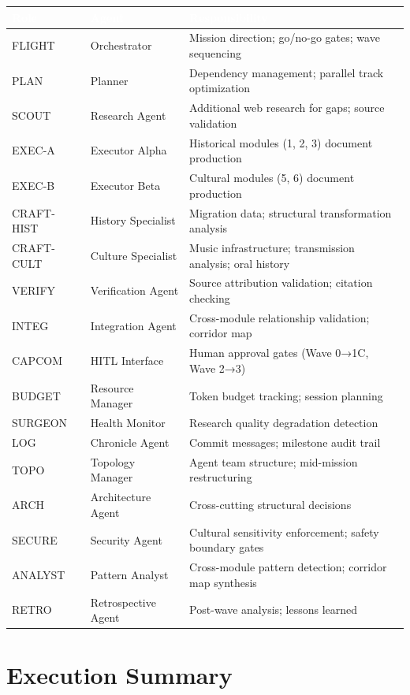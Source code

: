 \documentclass[11pt,letterpaper]{article}
\newcommand{\tableheader}[1]{\textbf{\sffamily\textcolor{white}{#1}}}
\begin{document}
\begin{center}
\begin{tabularx}{\textwidth}{L{2cm}L{3cm}X}
\toprule
{}
\tableheader{Role} & \tableheader{Agent} & \tableheader{Responsibility} \\
\midrule
FLIGHT & Orchestrator & Mission direction; go/no-go gates; wave sequencing \\
PLAN & Planner & Dependency management; parallel track optimization \\
SCOUT & Research Agent & Additional web research for gaps; source validation \\
EXEC-A & Executor Alpha & Historical modules (1, 2, 3) document production \\
EXEC-B & Executor Beta & Cultural modules (5, 6) document production \\
CRAFT-HIST & History Specialist & Migration data; structural transformation analysis \\
CRAFT-CULT & Culture Specialist & Music infrastructure; transmission analysis; oral history \\
VERIFY & Verification Agent & Source attribution validation; citation checking \\
INTEG & Integration Agent & Cross-module relationship validation; corridor map \\
CAPCOM & HITL Interface & Human approval gates (Wave 0→1C, Wave 2→3) \\
BUDGET & Resource Manager & Token budget tracking; session planning \\
SURGEON & Health Monitor & Research quality degradation detection \\
LOG & Chronicle Agent & Commit messages; milestone audit trail \\
TOPO & Topology Manager & Agent team structure; mid-mission restructuring \\
ARCH & Architecture Agent & Cross-cutting structural decisions \\
SECURE & Security Agent & Cultural sensitivity enforcement; safety boundary gates \\
ANALYST & Pattern Analyst & Cross-module pattern detection; corridor map synthesis \\
RETRO & Retrospective Agent & Post-wave analysis; lessons learned \\
\bottomrule
\end{tabularx}
\end{center}

\section{Execution Summary}
\end{document}
